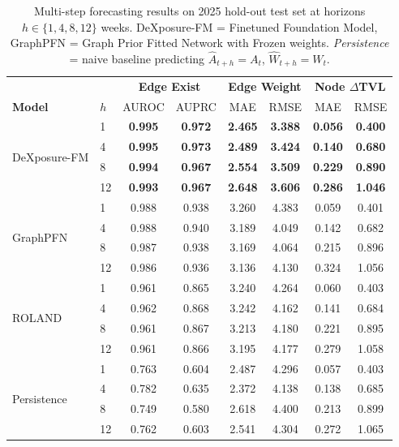 \begin{table}[t]
\centering
\small
\setlength{\tabcolsep}{4pt}
\begin{tabular}{llcccccc}
\hline
& & \multicolumn{2}{c}{\textbf{Edge Exist}} & \multicolumn{2}{c}{\textbf{Edge Weight}} & \multicolumn{2}{c}{\textbf{Node $\Delta$TVL}} \\
\textbf{Model} & $h$ & AUROC & AUPRC & MAE & RMSE & MAE & RMSE \\
\hline
\multirow{4}{*}{DeXposure-FM}
& 1 & \textbf{0.995} & \textbf{0.972} & \textbf{2.465} & \textbf{3.388} & \textbf{0.056} & \textbf{0.400} \\
& 4 & \textbf{0.995} & \textbf{0.973} & \textbf{2.489} & \textbf{3.424} & \textbf{0.140} & \textbf{0.680} \\
& 8 & \textbf{0.994} & \textbf{0.967} & \textbf{2.554} & \textbf{3.509} & \textbf{0.229} & \textbf{0.890} \\
& 12 & \textbf{0.993} & \textbf{0.967} & \textbf{2.648} & \textbf{3.606} & \textbf{0.286} & \textbf{1.046} \\
\hline
\multirow{4}{*}{GraphPFN}
& 1 & 0.988 & 0.938 & 3.260 & 4.383 & 0.059 & 0.401 \\
& 4 & 0.988 & 0.940 & 3.189 & 4.049 & 0.142 & 0.682 \\
& 8 & 0.987 & 0.938 & 3.169 & 4.064 & 0.215 & 0.896 \\
& 12 & 0.986 & 0.936 & 3.136 & 4.130 & 0.324 & 1.056 \\
\hline
\multirow{4}{*}{ROLAND}
& 1 & 0.961 & 0.865 & 3.240 & 4.264 & 0.060 & 0.403 \\
& 4 & 0.962 & 0.868 & 3.242 & 4.162 & 0.141 & 0.684 \\
& 8 & 0.961 & 0.867 & 3.213 & 4.180 & 0.221 & 0.895 \\
& 12 & 0.961 & 0.866 & 3.195 & 4.177 & 0.279 & 1.058 \\
\hline
\multirow{4}{*}{Persistence}
& 1 & 0.763 & 0.604 & 2.487 & 4.296 & 0.057 & 0.403 \\
& 4 & 0.782 & 0.635 & 2.372 & 4.138 & 0.138 & 0.685 \\
& 8 & 0.749 & 0.580 & 2.618 & 4.400 & 0.213 & 0.899 \\
& 12 & 0.762 & 0.603 & 2.541 & 4.304 & 0.272 & 1.065 \\
\hline
\end{tabular}
\caption{Multi-step forecasting results on 2025 hold-out test set at horizons $h \in \{1,4,8,12\}$ weeks. DeXposure-FM = Finetuned Foundation Model, GraphPFN = Graph Prior Fitted Network with Frozen weights. \textit{Persistence} = naive baseline predicting $\hat{A}_{t+h} = A_t$, $\hat{W}_{t+h} = W_t$.}
\label{tab:main-results}
\end{table}

